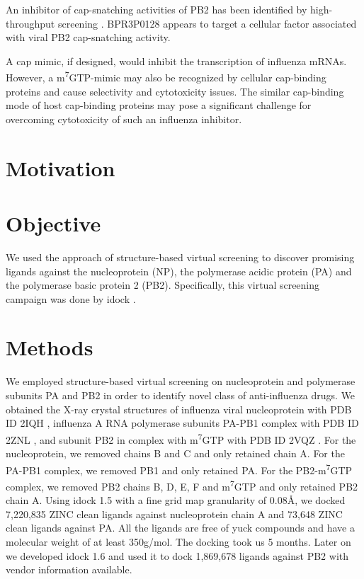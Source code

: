 An inhibitor of cap-snatching activities of PB2 has been identified by high-throughput screening \citep{1236}. BPR3P0128 appears to target a cellular factor associated with viral PB2 cap-snatching activity.

A cap mimic, if designed, would inhibit the transcription of influenza mRNAs. However, a m\textsuperscript{7}GTP-mimic may also be recognized by cellular cap-binding proteins and cause selectivity and cytotoxicity issues. The similar cap-binding mode of host cap-binding proteins may pose a significant challenge for overcoming cytotoxicity of such an influenza inhibitor.

\section{Motivation}



\section{Objective}

We used the approach of structure-based virtual screening to discover promising ligands against the nucleoprotein (NP), the polymerase acidic protein (PA) and the polymerase basic protein 2 (PB2). Specifically, this virtual screening campaign was done by idock \citep{1153}.

\section{Methods}

We employed structure-based virtual screening on nucleoprotein and polymerase subunits PA and PB2 in order to identify novel class of anti-influenza drugs. We obtained the X-ray crystal structures of influenza viral nucleoprotein with PDB ID 2IQH \citep{1140}, influenza A RNA polymerase subunits PA-PB1 complex with PDB ID 2ZNL \citep{1141}, and subunit PB2 in complex with m\textsuperscript{7}GTP with PDB ID 2VQZ \citep{1192}. For the nucleoprotein, we removed chains B and C and only retained chain A. For the PA-PB1 complex, we removed PB1 and only retained PA. For the PB2-m\textsuperscript{7}GTP complex, we removed PB2 chains B, D, E, F and m\textsuperscript{7}GTP and only retained PB2 chain A. Using idock 1.5 with a fine grid map granularity of 0.08\AA, we docked 7,220,835 ZINC \citep{532} clean ligands against nucleoprotein chain A and 73,648 ZINC clean ligands against PA. All the ligands are free of yuck compounds and have a molecular weight of at least 350g/mol. The docking took us 5 months. Later on we developed idock 1.6 and used it to dock 1,869,678 ligands against PB2 with vendor information available.

